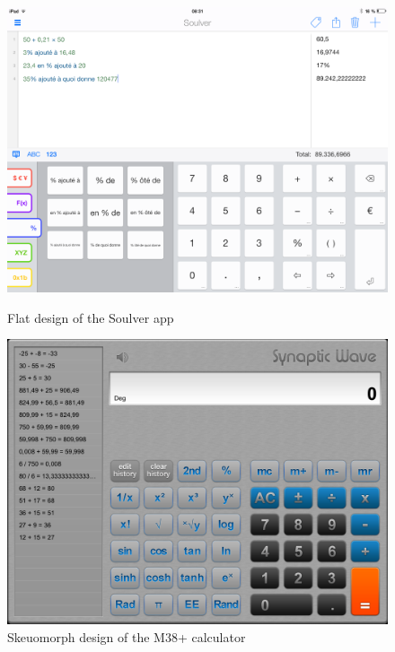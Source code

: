 \documentclass[a4paper,11pt] {article}
\theoremstyle{definition}
\begin{document}
    \begin{figure}
   \begin{minipage}[c]{.46\linewidth}
      \centering
      \includegraphics[scale=0.2]{fig-report/soulveur-screen.png}
         \caption{Flat design of the Soulver app\cite{soulver-ref}}
   \end{minipage} \hfill
   \begin{minipage}[c]{.46\linewidth}
   \centering
         \includegraphics[scale=0.2]{fig-report/m38-screen.png}
         \caption{Skeuomorph design of the M38+ calculator}
   \end{minipage}

\end{figure}
\end{document}
